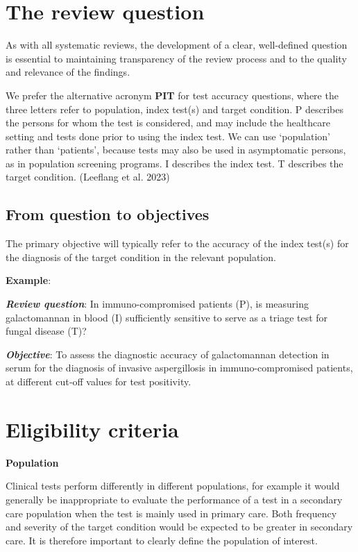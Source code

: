 \documentclass[
  11pt,
  a4paper,
  DIV=11,
  numbers=noendperiod]{scrreprt}
\begin{document}
\section{The review question}\label{the-review-question}

As with all systematic reviews, the development of a clear, well-defined
question is essential to maintaining transparency of the review process
and to the quality and relevance of the findings.

We prefer the alternative acronym \textbf{PIT} for test accuracy
questions, where the three letters refer to population, index test(s)
and target condition. P describes the persons for whom the test is
considered, and may include the healthcare setting and tests done prior
to using the index test. We can use `population' rather than `patients',
because tests may also be used in asymptomatic persons, as in population
screening programs. I describes the index test. T describes the target
condition. (Leeflang et al. 2023)

\subsection{From question to
objectives}\label{from-question-to-objectives}

The primary objective will typically refer to the accuracy of the index
test(s) for the diagnosis of the target condition in the relevant
population.

\textbf{Example}:

\textbf{\emph{Review question}}: In immuno-compromised patients (P), is
measuring galactomannan in blood (I) sufficiently sensitive to serve as
a triage test for fungal disease (T)?

\textbf{\emph{Objective}}: To assess the diagnostic accuracy of
galactomannan detection in serum for the diagnosis of invasive
aspergillosis in immuno-compromised patients, at different cut‐off
values for test positivity.

\section{Eligibility criteria}\label{eligibility-criteria-1}

\textbf{Population}

Clinical tests perform differently in different populations, for example
it would generally be inappropriate to evaluate the performance of a
test in a secondary care population when the test is mainly used in
primary care. Both frequency and severity of the target condition would
be expected to be greater in secondary care. It is therefore important
to clearly define the population of interest.
\end{document}
